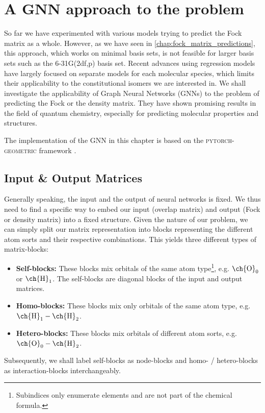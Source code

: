 \chapter{A GNN approach to the problem}
\label{chap:gnn}
So far we have experimented with various models trying to predict the Fock matrix as a whole. However, as we have seen in \autoref{chap:fock_matrix_predictions}, this approach, which works on minimal basis sets, is not feasible for larger basis sets such as the 6-31G(2df,p) basis set. Recent advances using regression models have largely focused on separate models for each molecular species, which limits their applicability to the constitutional isomers we are interested in. \parencite{ref:Hazra2024,ref:Shao2023}
We shall investigate the applicability of Graph Neural Networks (GNNs) to the problem of predicting the Fock or the density matrix. They have shown promising results in the field of quantum chemistry, especially for predicting molecular properties and structures. \parencite{ref:schnet2018}

The implementation of the GNN in this chapter is based on the \textsc{pytorch-geometric} framework \parencite{ref:PyTorchGeometric, ref:PyTorch_geom_paper}. 
\section{Input \& Output Matrices}
\label{sec:gnn_input_output_matrices}
Generally speaking, the input and the output of neural networks is fixed. We thus need to find a specific way to embed our input (overlap matrix) and output (Fock or density matrix) into a fixed structure. Given the nature of our problem, we can simply split our matrix representation into blocks representing the different atom sorts and their respective combinations. This yields three different types of matrix-blocks: 
\begin{itemize}
    \item \textbf{Self-blocks:} These blocks mix orbitals of the same atom type\footnote{Subindices only enumerate elements and are not part of the chemical formula.}, e.g. $\text{\ch{O}}_0$ or $\text{\ch{H}}_1$. The self-blocks are diagonal blocks of the input and output matrices.
    \item \textbf{Homo-blocks:} These blocks mix only orbitals of the same atom type, e.g. $\text{\ch{H}}_1 - \text{\ch{H}}_2$.
    \item \textbf{Hetero-blocks:} These blocks mix orbitals of different atom sorts, e.g. $\text{\ch{O}}_0 - \text{\ch{H}}_2$.
\end{itemize}
Subsequently, we shall label self-blocks as node-blocks and homo- / hetero-blocks as interaction-blocks interchangeably. 

